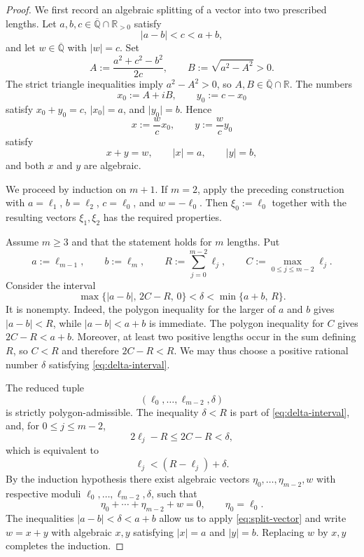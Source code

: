 \documentclass[10pt,a4paper]{amsart}
\numberwithin{equation}{section}
\newcommand{\R}{\mathbb R}
\newcommand{\Qbar}{\overline{\mathbb Q}}
\newcommand{\abs}[1]{\lvert #1\rvert}
\begin{document}
\begin{proof}
We first record an algebraic splitting of a vector into two prescribed
lengths. Let $a,b,c\in\Qbar\cap\R_{>0}$ satisfy
\[
        \abs{a-b}<c<a+b,
\]
and let $w\in\Qbar$ with $\abs w=c$. Set
\[
        A:=\frac{a^2+c^2-b^2}{2c},
        \qquad
        B:=\sqrt{a^2-A^2}>0.
\]
The strict triangle inequalities imply $a^2-A^2>0$, so $A,B\in\Qbar\cap \R$.
The numbers
\[
        x_0:=A+iB,
        \qquad
        y_0:=c-x_0
\]
satisfy $x_0+y_0=c$, $\abs{x_0}=a$, and $\abs{y_0}=b$. Hence
\begin{equation}\label{eq:split-vector}
        x:=\frac{w}{c}x_0,
        \qquad
        y:=\frac{w}{c}y_0
\end{equation}
satisfy
\[
        x+y=w,
        \qquad
        \abs x=a,
        \qquad
        \abs y=b,
\]
and both $x$ and $y$ are algebraic.

We proceed by induction on $m+1$. If $m=2$, apply the preceding construction
with $a=\ell_1$, $b=\ell_2$, $c=\ell_0$, and $w=-\ell_0$. Then
$\xi_0:=\ell_0$ together with the resulting vectors $\xi_1,\xi_2$ has the
required properties.

Assume $m\geq3$ and that the statement holds for $m$ lengths. Put
\[
        a:=\ell_{m-1},
        \qquad
        b:=\ell_m,
        \qquad
        R:=\sum_{j=0}^{m-2}\ell_j,
        \qquad
        C:=\max_{0\leq j\leq m-2}\ell_j.
\]
Consider the interval
\begin{equation}\label{eq:delta-interval}
        \max\{\abs{a-b},\,2C-R,\,0\}
        <\delta<
        \min\{a+b,\,R\}.
\end{equation}
It is nonempty. Indeed, the polygon inequality for the larger of $a$ and
$b$ gives $\abs{a-b}<R$, while $\abs{a-b}<a+b$ is immediate. The polygon
inequality for $C$ gives $2C-R<a+b$. Moreover, at least two positive lengths
occur in the sum defining $R$, so $C<R$ and therefore $2C-R<R$. We may thus
choose a positive rational number $\delta$ satisfying
\eqref{eq:delta-interval}.

The reduced tuple
\[
        (\ell_0,\ldots,\ell_{m-2},\delta)
\]
is strictly polygon-admissible. The inequality $\delta<R$ is part of
\eqref{eq:delta-interval}, and, for $0\leq j\leq m-2$,
\[
        2\ell_j-R\leq2C-R<\delta,
\]
which is equivalent to
\[
        \ell_j<(R-\ell_j)+\delta.
\]
By the induction hypothesis there exist algebraic vectors
$\eta_0,\ldots,\eta_{m-2},w$ with respective moduli
$\ell_0,\ldots,\ell_{m-2},\delta$, such that
\[
        \eta_0+\cdots+\eta_{m-2}+w=0,
        \qquad
        \eta_0=\ell_0.
\]
The inequalities $\abs{a-b}<\delta<a+b$ allow us to apply
\eqref{eq:split-vector} and write $w=x+y$ with algebraic $x,y$ satisfying
$\abs x=a$ and $\abs y=b$. Replacing $w$ by $x,y$ completes the induction.
\end{proof}
\end{document}
